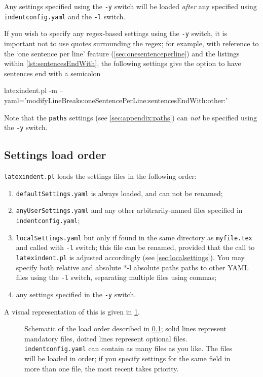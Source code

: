  Any settings specified using the \texttt{-y} switch will be loaded \emph{after} any
 specified using \texttt{indentconfig.yaml} and the \texttt{-l} switch.

 If you wish to specify any regex-based settings using the \texttt{-y} switch,
  it is important not to use quotes
 surrounding the regex; for example, with reference to the `one sentence per line'
 feature (\vref{sec:onesentenceperline}) and the listings within
 \vref{lst:sentencesEndWith}, the following settings give the option to have sentences
 end with a semicolon 

 \begin{commandshell}
latexindent.pl -m --yaml='modifyLineBreaks:oneSentencePerLine:sentencesEndWith:other:\;'
\end{commandshell}

 Note that the \texttt{paths} settings (see \vref{sec:appendix:paths}) can \emph{not} be
 specified using the \texttt{-y} switch.

\subsection{Settings load order}\label{sec:loadorder}
 \texttt{latexindent.pl} loads the settings files in the following order:
 \begin{enumerate}
  \item \texttt{defaultSettings.yaml} is always loaded, and can not be renamed;
  \item \texttt{anyUserSettings.yaml} and any other arbitrarily-named files specified in
        \texttt{indentconfig.yaml};
  \item \texttt{localSettings.yaml} but only if found in the same directory as
        \texttt{myfile.tex}
        and called with \texttt{-l} switch; this file can be renamed, provided that the call to
        \texttt{latexindent.pl} is adjusted accordingly (see \cref{sec:localsettings}). You may
        specify both relative and absolute%
        *{-l absolute paths} paths to other YAML files using the \texttt{-l}
        switch, separating multiple files using commas;
  \item any settings  specified in the
        \texttt{-y} switch.%
 \end{enumerate}
 A visual representation of this is given in \cref{fig:loadorder}.

 \begin{figure}[!htb]
  \centering
  
  \caption{Schematic of the load order described in \cref{sec:loadorder}; solid lines represent
  mandatory files, dotted lines represent optional files. \texttt{indentconfig.yaml} can
  contain as many files as you like. The files will be loaded in order; if you specify
  settings for the same field in more than one file, the most recent takes priority. }
  \label{fig:loadorder}
 \end{figure}
